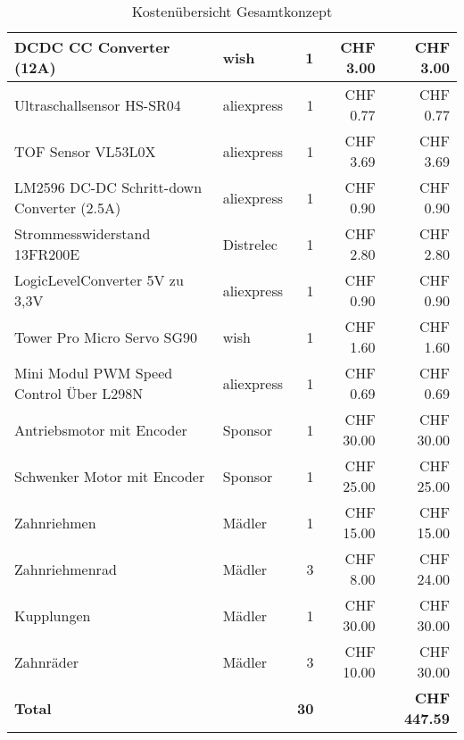 \documentclass[../../main.tex]{subfiles}
\begin{document}
\begin{table}[H]
\begin{tabular}{|p{6cm}|l|r|r|r|}
    DC\-DC CC Converter (12A)                               & wish               & 1               & CHF 3.00            & CHF 3.00              \\ \hline
    Ultraschallsensor HS-SR04                               & aliexpress         & 1               & CHF 0.77            & CHF 0.77              \\ \hline
    TOF Sensor VL53L0X                                      & aliexpress         & 1               & CHF 3.69            & CHF 3.69              \\ \hline
    LM2596 DC-DC Schritt-down Converter (2.5A)              & aliexpress         & 1               & CHF 0.90            & CHF 0.90              \\ \hline
    Strommesswiderstand 13FR200E                            & Distrelec          & 1               & CHF 2.80            & CHF 2.80              \\ \hline
    Logic\-Level\-Converter 5V zu 3,3V                      & aliexpress         & 1               & CHF 0.90            & CHF 0.90              \\ \hline
    Tower Pro Micro Servo SG90                              & wish               & 1               & CHF 1.60            & CHF 1.60              \\ \hline
    Mini Modul PWM Speed Control Über L298N                 & aliexpress         & 1               & CHF 0.69            & CHF 0.69              \\ \hline
    Antriebsmotor mit Encoder                               & Sponsor            & 1               & CHF 30.00           & CHF 30.00             \\ \hline
    Schwenker Motor mit Encoder                             & Sponsor            & 1               & CHF 25.00           & CHF 25.00             \\ \hline
    Zahnriehmen                                             & Mädler             & 1               & CHF 15.00           & CHF 15.00             \\ \hline
    Zahnriehmenrad                                          & Mädler             & 3               & CHF 8.00            & CHF 24.00             \\ \hline
    Kupplungen                                              & Mädler             & 1               & CHF 30.00           & CHF 30.00             \\ \hline
    Zahnräder                                               & Mädler             & 3               & CHF 10.00           & CHF 30.00             \\ \hline \hline
    \textbf{Total}                                          & \textbf{}          & \textbf{30}     & \textbf{}           & \textbf{CHF 447.59}   \\ \hline
    \end{tabular}
    \caption{Kostenübersicht Gesamtkonzept}
    \label{tab:kosten_total}
    \end{table}

    
\end{document}
